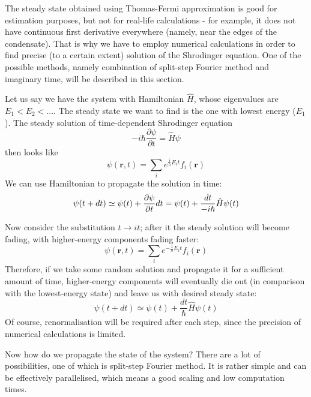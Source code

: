 \documentclass[12pt,notitlepage]{report}
\author{Bogdan Opanchuk}
\begin{document}
The steady state obtained using Thomas-Fermi approximation is good for estimation purposes, but not for
real-life calculations - for example, it does not have continuous first derivative everywhere (namely,
near the edges of the condensate). That is why we have to employ numerical calculations in order
to find precise (to a certain extent) solution of the Shrodinger equation. One of the possible methods, 
namely combination of split-step Fourier method and imaginary time, will be described in this section.

Let us say we have the system with Hamiltonian $\hat{H}$, whose eigenvalues are $E_1 < E_2 < ...$.
The steady state we want to find is the one with lowest energy ($E_1$). The steady solution of time-dependent
Shrodinger equation
\[ -i \hbar \frac{\partial \psi}{\partial t} = \hat{H} \psi \]
then looks like
\[ \psi(\mathbf{r}, t) = \sum_i e^{\frac{i}{h} E_i t} f_i(\mathbf{r}) \]
We can use Hamiltonian to propagate the solution in time:
\[ 
\psi(t + dt) \simeq \psi(t) + \frac{\partial \psi}{\partial t} dt = \\
\psi(t) + \frac{dt}{-i \hbar} \hat{H} \psi(t)
\]

Now consider the substitution $t \rightarrow it$; after it the steady solution will become fading, with
higher-energy components fading faster:
\[ \psi(\mathbf{r}, t) = \sum_i e^{- \frac{1}{h} E_i t} f_i(\mathbf{r}) \]
Therefore, if we take some random solution and propagate it for a sufficient amount of time, higher-energy
components will eventually die out (in comparison with the lowest-energy state) and leave us with desired 
steady state:
\[ \psi(t + dt) \simeq \psi(t) + \frac{dt}{\hbar} \hat{H} \psi(t)\]
Of course, renormalisation will be required after each step, since the precision of numerical calculations is limited.

Now how do we propagate the state of the system? There are a lot of possibilities, one of which is split-step
Fourier method. It is rather simple and can be effectively parallelised, which means a good scaling and 
low computation times. 
\end{document}
